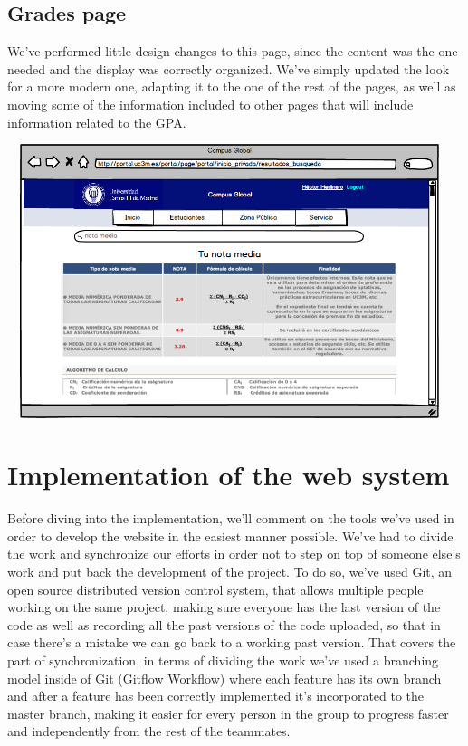 \documentclass{article}
\begin{document}
\subsection{Grades page}
We’ve performed little design changes to this page, since the content was the one needed and the display was correctly organized. We’ve simply updated the look for a more modern one, adapting it to the one of the rest of the pages, as well as moving some of the information included to other pages that will include information related to the GPA.

\begin{center}
\includegraphics[width=13cm, height=8cm, keepaspectratio]{mockup_notamedia}
\end{center}

\section{Implementation of the web system}

Before diving into the implementation, we'll comment on the tools we've used in order to develop the website in the easiest manner possible. We've had to divide the work and synchronize our efforts in order not to step on top of someone else's work and put back the development of the project. To do so, we've used Git, an open source distributed version control system, that allows multiple people working on the same project, making sure everyone has the last version of the code as well as recording all the past versions of the code uploaded, so that in case there's a mistake we can go back to a working past version. That covers the part of synchronization, in terms of dividing the work we've used a branching model inside of Git (Gitflow Workflow) where each feature has its own branch and after a feature has been correctly implemented it's incorporated to the master branch, making it easier for every person in the group to progress faster and independently from the rest of the teammates. 
\end{document}
